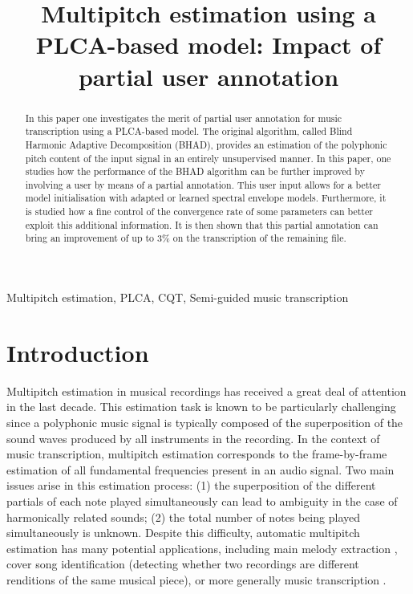 \documentclass{article}
\title{Multipitch estimation using a PLCA-based model: Impact of partial user annotation} %
\begin{document}
\ninept
%
\maketitle
%
\begin{abstract}
In this paper one investigates the merit of partial user annotation for music transcription using a PLCA-based model. The original algorithm, called Blind Harmonic Adaptive Decomposition (BHAD), provides an estimation of the polyphonic pitch content of the input signal in an entirely unsupervised manner. In this paper, one studies how the performance of the BHAD algorithm can be further improved by involving a user by means of a partial annotation. This user input allows for a better model initialisation with adapted or learned spectral envelope models. Furthermore, it is studied how a fine control of the convergence rate of some parameters can better exploit this additional information. It is then shown that this partial annotation can bring an improvement of up to 3\% on the transcription of the remaining file.
\end{abstract}
%
\begin{keywords}
Multipitch estimation, PLCA, CQT, Semi-guided music transcription
\end{keywords}
%


\section{Introduction}
\label{sec:intro}

Multipitch estimation in musical recordings has received a great deal of attention in the last decade. This estimation task is known to be particularly challenging since a polyphonic music signal is typically composed of the
superposition of the sound waves produced by all instruments in the recording. In the context of music transcription,
multipitch estimation corresponds to the frame-by-frame estimation of all fundamental frequencies present in an audio signal.
Two main issues arise in this estimation process: (1)
the superposition of the different partials of each note played simultaneously can lead to ambiguity in the case of harmonically related sounds; (2) the total number of notes being played simultaneously is unknown.
Despite this difficulty, automatic multipitch estimation has many potential applications, including main melody extraction \cite{JS:SigMag2014, Durrieu2011, toosMelodyICASSP10}, cover song identification \cite{salamonVersionIDQBH-MMIR13} (detecting whether two recordings are different renditions of the same musical piece), or more generally music transcription \cite{HainsworthPhD}.
\end{document}
